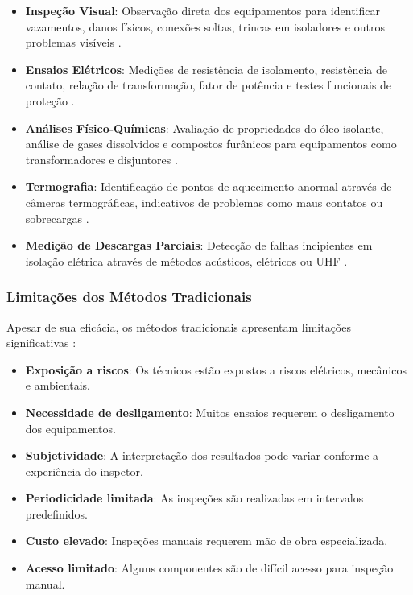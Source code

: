 \begin{itemize}
    \item \textbf{Inspeção Visual}: Observação direta dos equipamentos para identificar vazamentos, danos físicos, conexões soltas, trincas em isoladores e outros problemas visíveis \cite{Inovarum2017}.
    
    \item \textbf{Ensaios Elétricos}: Medições de resistência de isolamento, resistência de contato, relação de transformação, fator de potência e testes funcionais de proteção \cite{Conprove2019}.
    
    \item \textbf{Análises Físico-Químicas}: Avaliação de propriedades do óleo isolante, análise de gases dissolvidos e compostos furânicos para equipamentos como transformadores e disjuntores \cite{Inovarum2017}.
    
    \item \textbf{Termografia}: Identificação de pontos de aquecimento anormal através de câmeras termográficas, indicativos de problemas como maus contatos ou sobrecargas \cite{Pixforce2024}.
    
    \item \textbf{Medição de Descargas Parciais}: Detecção de falhas incipientes em isolação elétrica através de métodos acústicos, elétricos ou UHF \cite{Frontin2013}.
\end{itemize}

\subsubsection{Limitações dos Métodos Tradicionais}

Apesar de sua eficácia, os métodos tradicionais apresentam limitações significativas \cite{GlobalGrowthInsights2024}:

\begin{itemize}
    \item \textbf{Exposição a riscos}: Os técnicos estão expostos a riscos elétricos, mecânicos e ambientais.
    \item \textbf{Necessidade de desligamento}: Muitos ensaios requerem o desligamento dos equipamentos.
    \item \textbf{Subjetividade}: A interpretação dos resultados pode variar conforme a experiência do inspetor.
    \item \textbf{Periodicidade limitada}: As inspeções são realizadas em intervalos predefinidos.
    \item \textbf{Custo elevado}: Inspeções manuais requerem mão de obra especializada.
    \item \textbf{Acesso limitado}: Alguns componentes são de difícil acesso para inspeção manual.
\end{itemize}

